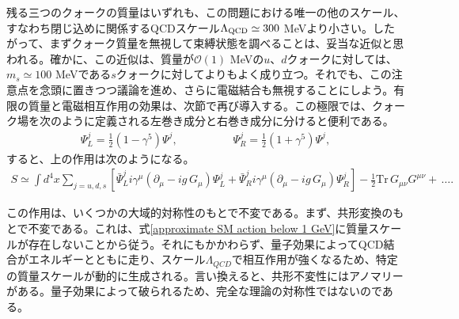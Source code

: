 残る三つのクォークの質量はいずれも、この問題における唯一の他のスケール、すなわち閉じ込めに関係するQCDスケール$\Lambda_{\rm QCD}  \simeq 300$ MeVより小さい。したがって、まずクォーク質量を無視して束縛状態を調べることは、妥当な近似と思われる。確かに、この近似は、質量が$\mathcal{O}(1)$ MeVの$u$、$d$クォークに対しては、$m_s \simeq 100$ MeVである$s$クォークに対してよりもよく成り立つ。それでも、この注意点を念頭に置きつつ議論を進め、さらに電磁結合も無視することにしよう。有限の質量と電磁相互作用の効果は、次節で再び導入する。この極限では、クォーク場を次のように定義される左巻き成分と右巻き成分に分けると便利である。
%
\begin{align}
	\Psi^j_L = \tfrac{1}{2} (1 - \gamma^5) \Psi^j, \qquad \qquad \quad \Psi^j_R = \tfrac{1}{2} (1 + \gamma^5) \Psi^j, 
\end{align}
%
すると、上の作用は次のようになる。
%
\begin{align} \label{approximate SM action below 1 GeV}
	S \simeq \!\int d^4x \!\!\! \sum_{j=u,d,s} \!\! \left[ \bar \Psi_L^j i \gamma^\mu (\partial_\mu - i g \, G_\mu ) \Psi_L^j + \bar \Psi_R^j i \gamma^\mu (\partial_\mu - i g \, G_\mu ) \Psi_R^j \right] - \frac{1}{2} \mbox{Tr} \, G_{\mu\nu} G^{\mu\nu} + \, \dots .
\end{align}
%

この作用は、いくつかの大域的対称性のもとで不変である。まず、共形変換のもとで不変である。これは、式\eqref{approximate SM action below 1 GeV}に質量スケールが存在しないことから従う。それにもかかわらず、量子効果によってQCD結合がエネルギーとともに走り、スケール$\Lambda_{QCD}$で相互作用が強くなるため、特定の質量スケールが動的に生成される。言い換えると、共形不変性にはアノマリーがある。量子効果によって破られるため、完全な理論の対称性ではないのである。

